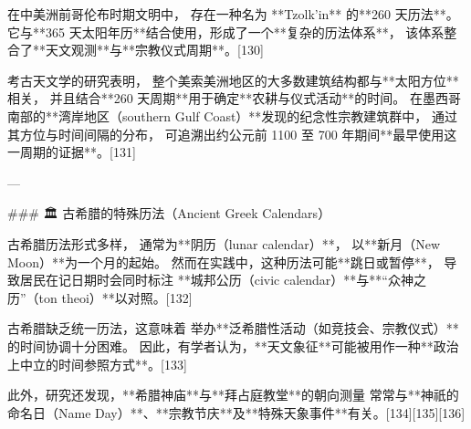在中美洲前哥伦布时期文明中，
存在一种名为 **Tzolk’in** 的**260 天历法**。
它与**365 天太阳年历**结合使用，形成了一个**复杂的历法体系**，
该体系整合了**天文观测**与**宗教仪式周期**。[130]

考古天文学的研究表明，
整个美索美洲地区的大多数建筑结构都与**太阳方位**相关，
并且结合**260 天周期**用于确定**农耕与仪式活动**的时间。
在墨西哥南部的**湾岸地区（southern Gulf Coast）**发现的纪念性宗教建筑群中，
通过其方位与时间间隔的分布，
可追溯出约公元前 1100 至 700 年期间**最早使用这一周期的证据**。[131]

---

### 🏛 古希腊的特殊历法（Ancient Greek Calendars）

古希腊历法形式多样，
通常为**阴历（lunar calendar）**，
以**新月（New Moon）**为一个月的起始。
然而在实践中，这种历法可能**跳日或暂停**，
导致居民在记日期时会同时标注
**城邦公历（civic calendar）**与**“众神之历”（ton theoi）**以对照。[132]

古希腊缺乏统一历法，这意味着
举办**泛希腊性活动（如竞技会、宗教仪式）**的时间协调十分困难。
因此，有学者认为，**天文象征**可能被用作一种**政治上中立的时间参照方式**。[133]

此外，研究还发现，**希腊神庙**与**拜占庭教堂**的朝向测量
常常与**神祇的命名日（Name Day）**、**宗教节庆**及**特殊天象事件**有关。[134][135][136]
